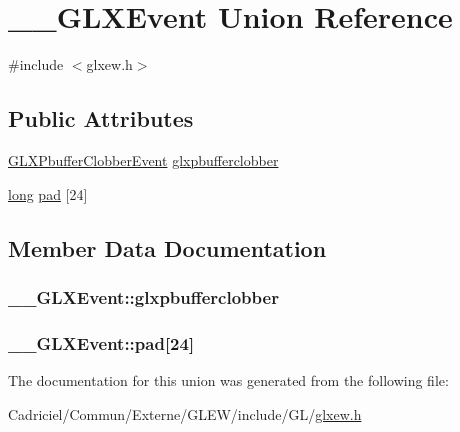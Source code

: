 \hypertarget{union_____g_l_x_event}{\section{\-\_\-\-\_\-\-G\-L\-X\-Event Union Reference}
\label{union_____g_l_x_event}
}


{\ttfamily \#include $<$glxew.\-h$>$}

\subsection*{Public Attributes}
\begin{DoxyCompactItemize}
\item 
\hyperlink{struct_g_l_x_pbuffer_clobber_event}{G\-L\-X\-Pbuffer\-Clobber\-Event} \hyperlink{union_____g_l_x_event_ada5880e2b424bcb2f60a411aaf713fae}{glxpbufferclobber}
\item 
\hyperlink{_free_image_8h_a7701bb16365a51acda9234120673781d}{long} \hyperlink{union_____g_l_x_event_a1cb8f6e7e77a34d25baf43b3f3bc2d4f}{pad} \mbox{[}24\mbox{]}
\end{DoxyCompactItemize}


\subsection{Member Data Documentation}
\hypertarget{union_____g_l_x_event_ada5880e2b424bcb2f60a411aaf713fae}{
\subsubsection[{glxpbufferclobber}]{ \-\_\-\-\_\-\-G\-L\-X\-Event\-::glxpbufferclobber}}\label{union_____g_l_x_event_ada5880e2b424bcb2f60a411aaf713fae}
\hypertarget{union_____g_l_x_event_a1cb8f6e7e77a34d25baf43b3f3bc2d4f}{
\subsubsection[{pad}]{ \-\_\-\-\_\-\-G\-L\-X\-Event\-::pad\mbox{[}24\mbox{]}}}\label{union_____g_l_x_event_a1cb8f6e7e77a34d25baf43b3f3bc2d4f}


The documentation for this union was generated from the following file\-:\begin{DoxyCompactItemize}
\item 
Cadriciel/\-Commun/\-Externe/\-G\-L\-E\-W/include/\-G\-L/\hyperlink{glxew_8h}{glxew.\-h}\end{DoxyCompactItemize}
